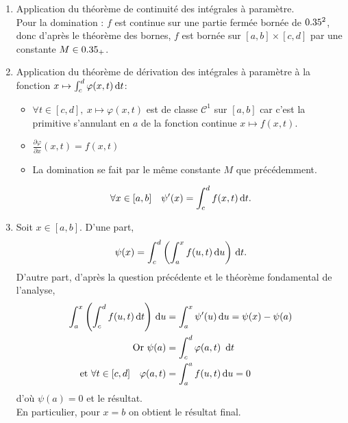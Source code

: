 \begin{solution}
    \begin{enumerate}
        \item Application du théorème de continuité des intégrales à paramètre. \\
        Pour la domination : $f$ est continue sur une partie fermée bornée de $0.35^2$, donc d'après le théorème des bornes, $f$ est bornée sur $[a, b] \times [c, d]$ par une constante $M \in 0.35_+$.
        \item Application du théorème de dérivation des intégrales à paramètre à la fonction $x \mapsto \int_{c}^{d} \varphi(x, t) \, \mathrm{d} t$:
        \begin{itemize}
            \item $\forall t \in [c, d],\ x \mapsto \varphi(x, t)$ est de classe $\mathscr{C}^1$ sur $[a, b]$ car c'est la primitive s'annulant en $a$ de la fonction continue $x \mapsto f(x, t)$. 
            \item $\frac{\partial \varphi}{\partial x}(x, t) = f(x, t)$
            \item La domination se fait par le même constante $M$ que précédemment. 
        \end{itemize}
        $$\forall x \in [a, b] \quad \psi'(x) = \int_{c}^{d} f(x, t) \, \mathrm{d} t.$$
        \item Soit $x \in [a, b]$. D'une part,
        $$\psi(x) = \int_{c}^{d} \left ( \int_{a}^{x} f(u,t) \, \mathrm{d} u \right) \, \mathrm{d} t.$$
        D'autre part, d'après la question précédente et le théorème fondamental de l'analyse, 
        \begin{align*}
            \int_{a}^{x} \left ( \int_{c}^{d} f(u,t) \, \mathrm{d} t \right) \, \mathrm{d} u &= \int_{a}^{x} \psi'(u) \, \mathrm{d} u  = \psi(x) - \psi(a) \\
            \text{Or } \psi(a) &= \int_{c}^{d} \varphi(a, t)\ \, \mathrm{d} t \\
            \text{et } \forall t \in [c, d] \quad \varphi(a, t) &= \int_{a}^{a} f(u, t) \, \mathrm{d} u = 0
        \end{align*}
        d'où $\psi(a) = 0$ et le résultat. \\
        En particulier, pour $x = b$ on obtient le résultat final.
    \end{enumerate}
\end{solution}    
